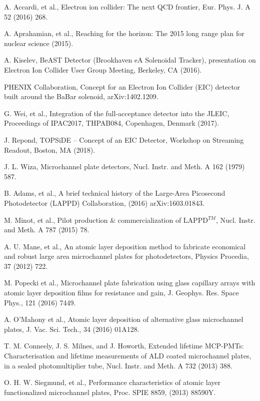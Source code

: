 ﻿\documentclass[preprint,5p]{elsarticle}
\begin{document}
\begin{thebibliography}{00}

A. Accardi, et al., Electron ion collider: The next QCD frontier, Eur. Phys. J. A 52 (2016) 268.

A. Aprahamian, et al., Reaching for the horizon: The 2015 long range plan for nuclear science (2015).

A. Kiselev, BeAST Detector (Brookhaven eA Solenoidal Tracker), presentation on Electron Ion Collider User Group Meeting, Berkeley, CA (2016).

PHENIX Collaboration, Concept for an Electron Ion Collider (EIC) detector built around the BaBar solenoid, arXiv:1402.1209.

G. Wei, et al., Integration of the full-acceptance detector into the JLEIC, Proceedings of IPAC2017, THPAB084, Copenhagen, Denmark (2017).

J. Repond, TOPSiDE – Concept of an EIC Detector, Workshop on Streaming Readout, Boston, MA (2018).

J. L. Wiza, Microchannel plate detectors, Nucl. Instr. and Meth. A 162 (1979) 587.

B. Adams, et al., A brief technical history of the Large-Area Picosecond Photodetector (LAPPD) Collaboration, (2016) arXiv:1603.01843.

M. Minot, et al., Pilot production \& commercialization of LAPPD$^{𝑇𝑀}$, 
      Nucl.  Instr. and Meth. A 787 (2015) 78.

A. U. Mane, et al., An atomic layer deposition method to fabricate economical and robust large area microchannel plates for photodetectors, Physics Procedia, 37 (2012) 722.

M. Popecki et al., Microchannel plate fabrication using glass capillary arrays with atomic layer deposition films for resistance and gain, J. Geophys. Res. Space Phys., 121 (2016) 7449.

A. O'Mahony et al., Atomic layer deposition of alternative glass microchannel plates, J. Vac. Sci. Tech., 34 (2016) 01A128.

T. M. Conneely, J. S. Milnes, and J. Howorth, Extended lifetime MCP-PMTs: Characterisation and lifetime measurements of ALD coated microchannel plates, in a sealed photomultiplier tube, Nucl. Instr. and Meth. A 732 (2013) 388.

O. H. W. Siegmund, et al., Performance characteristics of atomic layer functionalized microchannel plates, Proc. SPIE 8859, (2013) 88590Y.


\end{thebibliography}
\end{document}
